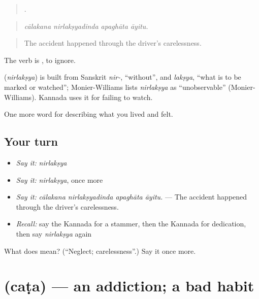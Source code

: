 \begin{quote}
   .
\end{quote}

\begin{quote}
\emph{cālakana nirlakṣyadinda apaghāta āyitu.}
\end{quote}

\begin{quote}
The accident happened through the driver's carelessness.
\end{quote}

The verb is , to ignore.

\begin{cousinweb}
\textbf{} (\emph{nirlakṣya}) is built from Sanskrit \emph{nir-}, \textquotedblleft{}without\textquotedblright{}, and \emph{lakṣya}, \textquotedblleft{}what is to be marked or watched\textquotedblright{}; Monier-Williams lists \emph{nirlakṣya} as \textquotedblleft{}unobservable\textquotedblright{} (Monier-Williams). Kannada uses it for failing to watch.
\end{cousinweb}

\begin{grammarlens}[title={What you've built}]
One more word for describing what you lived and felt.
\end{grammarlens}

\subsection*{Your turn}
\begin{itemize}
\raggedright
  \item \emph{Say it:} \emph{nirlakṣya}
  \item \emph{Say it:} \emph{nirlakṣya}, once more
  \item \emph{Say it:} \emph{cālakana nirlakṣyadinda apaghāta āyitu.} — The accident happened through the driver's carelessness.
  \item \emph{Recall:} say the Kannada for a stammer, then the Kannada for dedication, then say \emph{nirlakṣya} again
\end{itemize}

\begin{tcolorbox}[breakable,colback=teal!4,colframe=teal!35!black,title={Before you move on}]
What does  mean? (\textquotedblleft{}Neglect; carelessness\textquotedblright{}.) Say it once more.
\end{tcolorbox}
\section[\texorpdfstring{\kn{ಚಟ} (caṭa)}{ಚಟ (caṭa)}]{ (caṭa) — an addiction; a bad habit}

